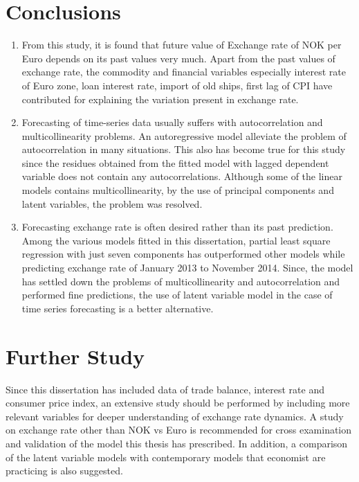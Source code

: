 \documentclass[12pt, lot, lof]{thesis}\usepackage[]{graphicx}\usepackage[]{color}
\begin{document}
\section{Conclusions}
\label{sec:conclusion}
\begin{enumerate}
\item From this study, it is found that future value of Exchange rate of NOK per Euro depends on its past values very much. Apart from the past values of exchange rate, the commodity and financial variables especially interest rate of Euro zone, loan interest rate, import of old ships, first lag of CPI have contributed for explaining the variation present in exchange rate.
\item Forecasting of time-series data usually suffers with autocorrelation and multicollinearity problems. An autoregressive model alleviate the problem of autocorrelation in many situations. This also has become true for this study since the residues obtained from the fitted model with lagged dependent variable does not contain any autocorrelations. Although some of the linear models contains multicollinearity, by the use of principal components and latent variables, the problem was resolved.
\item Forecasting exchange rate is often desired rather than its past prediction. Among the various models fitted in this dissertation, partial least square regression with just seven components has outperformed other models while predicting exchange rate of January 2013 to November 2014. Since, the model has settled down the problems of multicollinearity and autocorrelation and performed fine predictions, the use of latent variable model in the case of time series forecasting is a better alternative.
\end{enumerate}

\section{Further Study}
\label{sec:furtherStudy}
Since this dissertation has included data of trade balance, interest rate and consumer price index, an extensive study should be performed by including more relevant variables for deeper understanding of exchange rate dynamics. A study on exchange rate other than NOK vs Euro is recommended for cross examination and validation of the model this thesis has prescribed. In addition, a comparison of the latent variable models with contemporary models that economist are practicing is also suggested.
\end{document}
